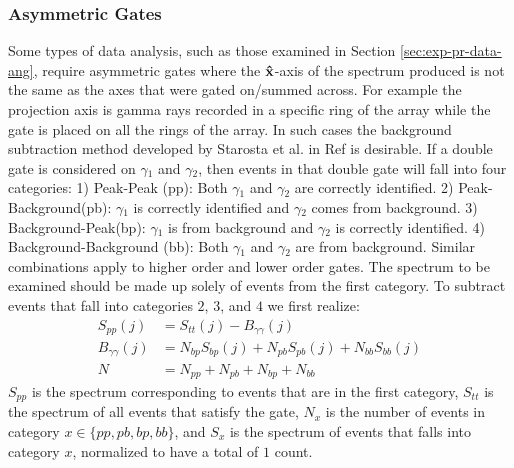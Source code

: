 \subsubsection{Asymmetric Gates}
\label{sssec:exp-pr-data-proc-bg-sub-asym}
Some types of data analysis, such as those examined in Section \ref{sec:exp-pr-data-ang}, require asymmetric gates where the $\boldsymbol{\hat{\textbf{x}}}$-axis of the spectrum produced is not the same as the axes that were gated on/summed across. For example the projection axis is gamma rays recorded in a specific ring of the array while the gate is placed on all the rings of the array. In such cases the background subtraction method developed by Starosta et al. in Ref \cite{asymBGSub} is desirable. If a double gate is considered on $\gamma{}_1$ and $\gamma{}_2$, then events in that double gate will fall into four categories: 1) Peak-Peak (pp): Both $\gamma{}_1$ and $\gamma{}_2$ are correctly identified. 2) Peak-Background(pb): $\gamma{}_1$ is correctly identified and $\gamma{}_2$ comes from background. 3) Background-Peak(bp): $\gamma{}_1$ is from background and $\gamma{}_2$ is correctly identified. 4) Background-Background (bb): Both $\gamma{}_1$ and $\gamma{}_2$ are from background. Similar combinations apply to higher order and lower order gates. The spectrum to be examined should be made up solely of events from the first category. To subtract events that fall into categories $2$, $3$, and $4$ we first realize:
\begin{align}
S_{pp}(j) &= S_{tt}(j) - B_{\gamma{}\gamma{}}(j)\label{eqn:chp3-asym-pp}\\
B_{\gamma{}\gamma{}}(j) &= N_{bp}S_{bp}(j) + N_{pb}S_{pb}(j) + N_{bb}S_{bb}(j)\label{eqn:chp3-asym-gg}\\
N &= N_{pp} + N_{pb} + N_{bp} + N_{bb} \label{eqn:chp3-asym-N}
\end{align}
$S_{pp}$ is the spectrum corresponding to events that are in the first category, $S_{tt}$ is the spectrum of all events that satisfy the gate, $N_{x}$ is the number of events in category $x\in{}\{pp,pb,bp,bb\}$, and $S_{x}$ is the spectrum of events that falls into category $x$, normalized to have a total of $1$ count.

